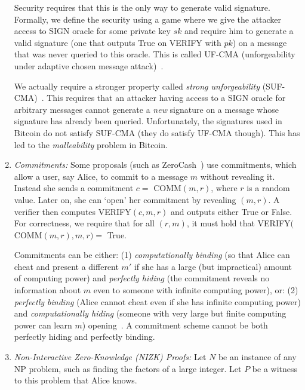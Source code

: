 \documentclass[]{report}   %
\begin{document}
\begin{enumerate}
	Security requires that this is the only way to generate valid signature. Formally, we define the security using a game where we give the attacker access to SIGN oracle for some private key $sk$ and require him to generate a valid signature (one that outputs True on VERIFY with $pk$) on a message that was never queried to this oracle.
	This is called UF-CMA (unforgeability under adaptive chosen message attack)~\cite{schneier1996one}.
	
	We actually require a stronger property called {\em strong unforgeability} (SUF-CMA)~\cite{boneh2006strongly}. This requires that an attacker having access to a SIGN oracle for arbitrary messages cannot generate a {\em new} signature on a message whose signature has already been queried. Unfortunately, the signatures used in Bitcoin do not satisfy SUF-CMA (they do satisfy UF-CMA though). This has led to the {\em malleability} problem in Bitcoin.
	\item {\em Commitments:} Some proposals (such as ZeroCash~\cite{sasson2014zerocash}) use commitments, which allow a user, say Alice, to commit to a message $m$ without revealing  it. Instead she sends a commitment $c =$ COMM$(m, r)$, where $r$ is a random value. Later on, she can `open' her commitment by revealing $(m, r)$. A verifier then computes VERIFY$(c, m, r )$ and outputs either True or False. For correctness, we require that for all $(r, m)$, it must hold that VERIFY$($COMM$(m, r), m, r) =$ True.
	
	Commitments can be either: (1) {\em computationally binding}
	(so that Alice can cheat and present a different $m'$ if she has a large (but impractical) amount of computing power) and {\em perfectly hiding} (the commitment reveals no information about $m$ even to someone with infinite computing power), or: (2) {\em perfectly binding} (Alice cannot cheat even if she has infinite computing power) and {\em computationally hiding} (someone with very large but finite computing power can learn $m$) opening~\cite{damgaard1999commitment}. A commitment scheme cannot be both perfectly hiding and perfectly binding.
	
	\item {\em Non-Interactive Zero-Knowledge (NIZK) Proofs:} Let $N$ be an instance of any NP problem, such as finding the factors of a large integer. Let $P$ be a witness to this problem that Alice knows. 
	

\end{enumerate}
\end{document}
